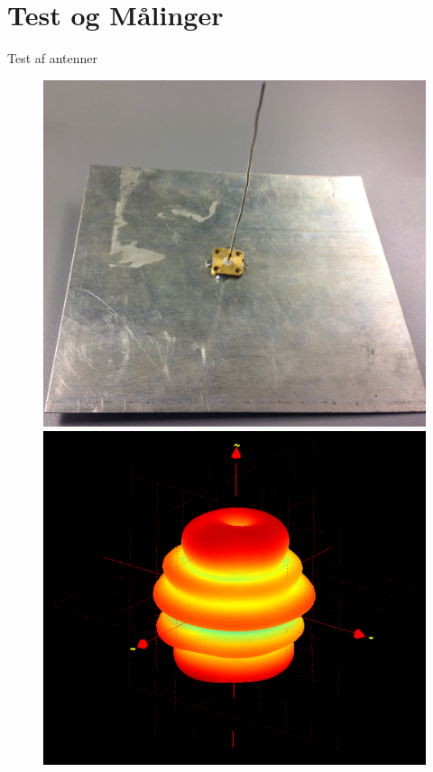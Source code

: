 \section{Test og Målinger}
\begin{frame}{Test af antenner}
\begin{minipage}{0.45\textwidth}
\begin{figure}[!htbp]
	\centering
	\includegraphics[width = 0.87\columnwidth]{figures/MonoAnt.jpg}\\
	\includegraphics[width = 0.87\columnwidth]{figures/MonoStor2500.png}
\end{figure}
\end{minipage}%

\end{frame}
